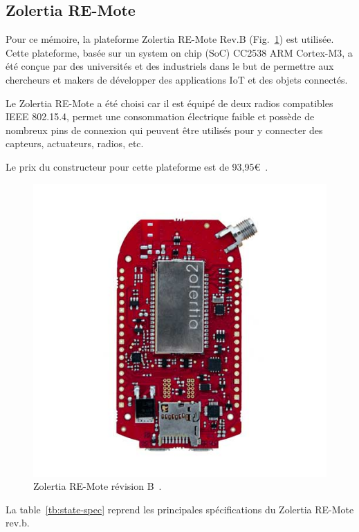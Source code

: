 \subsection*{Zolertia RE-Mote}
Pour ce mémoire, la plateforme Zolertia RE-Mote Rev.B (Fig.~\ref{fig:state-zolertia}) est utilisée.
Cette plateforme, basée sur un system on chip (SoC) CC2538 ARM Cortex-M3, a été conçue par des universités et des industriels dans le but de permettre aux chercheurs et makers de développer des applications IoT et des objets connectés.

Le Zolertia RE-Mote a été choisi car il est équipé de deux radios compatibles IEEE 802.15.4,
permet une consommation électrique faible et possède de nombreux pins de connexion qui peuvent être utilisés pour y connecter des capteurs, actuateurs, radios, etc.

Le prix du constructeur pour cette plateforme est de 93,95€~\cite{zolertia-remote:shop}.

\begin{figure}[H]
    \centering
    \includegraphics[scale=0.3]{res/pictures/remote-zolertia.jpg}
    \caption{Zolertia RE-Mote révision B~\cite{zolertia-remote:shop}.}
    \label{fig:state-zolertia}
\end{figure}

La table~\ref{tb:state-spec} reprend les principales spécifications du Zolertia RE-Mote rev.b.


